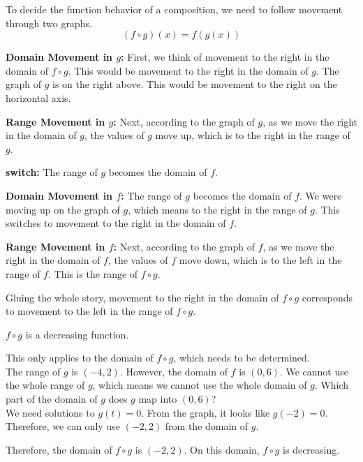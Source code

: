 \documentclass{ximera}
\begin{document}
To decide the function behavior of a composition, we need to follow movement through two graphs. \\



\[
(f \circ g)(x) = f(g(x))
\]



\textbf{\textcolor{blue!55!black}{Domain Movement in $g$:}}  First, we think of movement to the right in the domain of $f \circ g$.  This would be movement to the right in the domain of $g$.  The graph of $g$ is on the right above.  This would be movement to the right on the horizontal axis.



\textbf{\textcolor{blue!55!black}{Range Movement in $g$:}}  Next, according to the graph of $g$, as we move the right in the domain of $g$, the values of $g$ move up, which is to the right in the range of $g$.




\textbf{\textcolor{blue!55!black}{switch:}}   The range of $g$ becomes the domain of $f$.  


\textbf{\textcolor{blue!55!black}{Domain Movement in $f$:}}   The range of $g$ becomes the domain of $f$.  We were moving up on the graph of $g$, which means to the right in the range of $g$.  This switches to movement to the right in the domain of $f$.


\textbf{\textcolor{blue!55!black}{Range Movement in $f$:}}  Next, according to the graph of $f$, as we move the right in the domain of $f$, the values of $f$ move down, which is to the left in the range of $f$.  This is the range of $f \circ g$.




Gluing the whole story, movement to the right in the domain of $f \circ g$ corresponds to movement to the left in the range of $f \circ g$.

$f \circ g$ is a decreasing function.



\begin{observation}


This only applies to the domain of $f \circ g$, which needs to be determined. \\



The range of $g$ is $(-4, 2)$.  However, the domain of $f$ is $(0, 6)$.   We cannot use the whole range of $g$, which means we cannot use the whole domain of $g$.  Which part of the domain of $g$ does $g$ map into $(0, 6)$? \\


We need solutions to $g(t) = 0$.  From the graph, it looks like $g(-2) = 0$.  Therefore, we can only use $(-2, 2)$ from the domain of $g$.


Therefore, the domain of $f \circ g$ is $(-2, 2)$.  On this domain, $f \circ g$ is decreasing.



\end{observation}
\end{document}
